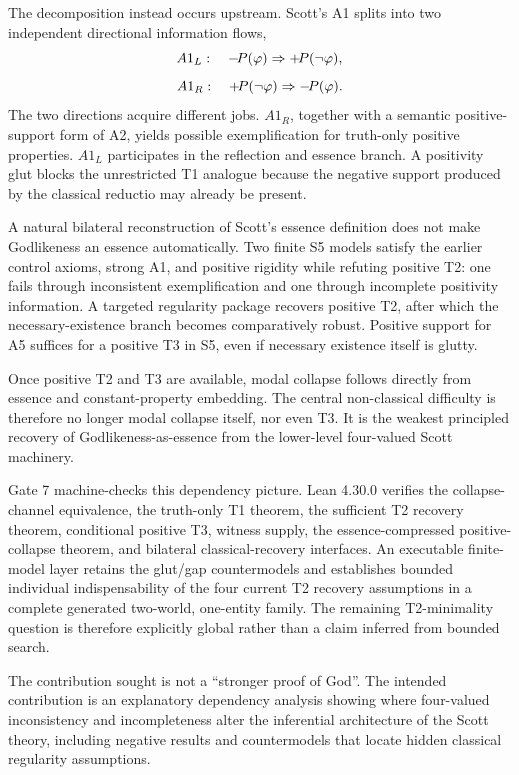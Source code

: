 The decomposition instead occurs upstream. Scott's A1 splits into two independent directional information flows,
\[
  A1_L:\quad -\!P(\varphi)\Rightarrow+\!P(\neg\varphi),
\]
\[
  A1_R:\quad +\!P(\neg\varphi)\Rightarrow-\!P(\varphi).
\]
The two directions acquire different jobs. \(A1_R\), together with a semantic positive-support form of A2, yields possible exemplification for truth-only positive properties. \(A1_L\) participates in the reflection and essence branch. A positivity glut blocks the unrestricted T1 analogue because the negative support produced by the classical reductio may already be present.

A natural bilateral reconstruction of Scott's essence definition does not make Godlikeness an essence automatically. Two finite S5 models satisfy the earlier control axioms, strong A1, and positive rigidity while refuting positive T2: one fails through inconsistent exemplification and one through incomplete positivity information. A targeted regularity package recovers positive T2, after which the necessary-existence branch becomes comparatively robust. Positive support for A5 suffices for a positive T3 in S5, even if necessary existence itself is glutty.

Once positive T2 and T3 are available, modal collapse follows directly from essence and constant-property embedding. The central non-classical difficulty is therefore no longer modal collapse itself, nor even T3. It is the weakest principled recovery of Godlikeness-as-essence from the lower-level four-valued Scott machinery.

Gate 7 machine-checks this dependency picture. Lean 4.30.0 verifies the collapse-channel equivalence, the truth-only T1 theorem, the sufficient T2 recovery theorem, conditional positive T3, witness supply, the essence-compressed positive-collapse theorem, and bilateral classical-recovery interfaces. An executable finite-model layer retains the glut/gap countermodels and establishes bounded individual indispensability of the four current T2 recovery assumptions in a complete generated two-world, one-entity family. The remaining T2-minimality question is therefore explicitly global rather than a claim inferred from bounded search.

The contribution sought is not a ``stronger proof of God''. The intended contribution is an explanatory dependency analysis showing where four-valued inconsistency and incompleteness alter the inferential architecture of the Scott theory, including negative results and countermodels that locate hidden classical regularity assumptions.

